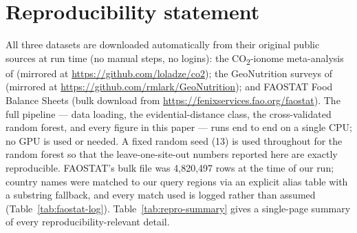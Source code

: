 \documentclass{article}
\begin{document}
\section{Reproducibility statement}
\label{app:reproducibility}

All three datasets are downloaded automatically from their original public sources at run time (no manual steps, no logins): the CO\textsubscript{2}-ionome meta-analysis of \citet{loladze2014hidden} (mirrored at \url{https://github.com/loladze/co2}); the GeoNutrition surveys of \citet{kumssa2022geonutrition} (mirrored at \url{https://github.com/rmlark/GeoNutrition}); and FAOSTAT Food Balance Sheets (bulk download from \url{https://fenixservices.fao.org/faostat}). The full pipeline --- data loading, the evidential-distance class, the cross-validated random forest, and every figure in this paper --- runs end to end on a single CPU; no GPU is used or needed. A fixed random seed (13) is used throughout for the random forest so that the leave-one-site-out numbers reported here are exactly reproducible. FAOSTAT's bulk file was 4{,}820{,}497 rows at the time of our run; country names were matched to our query regions via an explicit alias table with a substring fallback, and every match used is logged rather than assumed (Table~\ref{tab:faostat-log}). Table~\ref{tab:repro-summary} gives a single-page summary of every reproducibility-relevant detail.
\end{document}
